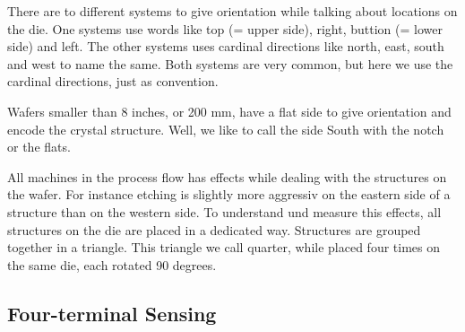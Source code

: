 There are to different systems to give orientation while talking about locations on the die. One systems use words like top (= upper side), right, buttion (= lower side) and left. The other systems uses cardinal directions like north, east, south and west to name the same. Both systems are very common, but here we use the cardinal directions, just as convention.

Wafers smaller than 8 inches, or 200 mm, have a flat side to give orientation and encode the crystal structure. Well, we like to call the side South with the notch or the flats.

All machines in the process flow has effects while dealing with the structures on the wafer. For instance etching is slightly more aggressiv on the eastern side of a structure than on the western side. To understand und measure this effects, all structures on the die are placed in a dedicated way. Structures are grouped together in a triangle. This triangle we call quarter, while placed four times on the same die, each rotated 90 degrees.



\subsection{Four-terminal Sensing}




\clearpage
